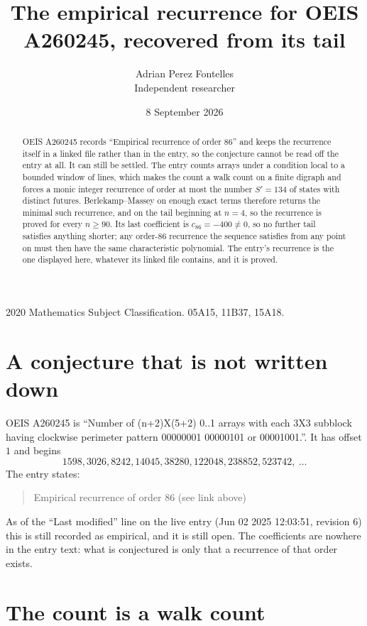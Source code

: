 \documentclass[11pt,a4paper]{article}
\title{The empirical recurrence for OEIS A260245, recovered from its tail}
\author{Adrian Perez Fontelles\\ \small Independent researcher}
\date{8 September 2026}
\theoremstyle{plain}
\theoremstyle{definition}
\begin{document}
\maketitle

\begin{abstract}
OEIS A260245 records ``Empirical recurrence of order $86$'' and keeps the recurrence itself in
a linked file rather than in the entry, so the conjecture cannot be read off the entry at all.
It can still be settled. The entry counts arrays under a condition local to a bounded window of
lines, which makes the count a walk count on a finite digraph and forces a monic integer
recurrence of order at most the number $S'=134$ of states with distinct futures. Berlekamp--Massey on
enough exact terms therefore returns the minimal such recurrence, and on the tail beginning at $n=4$, so the recurrence is proved for every $n\ge90$.
Its last coefficient is $c_{86}=-400\neq0$, so no further tail satisfies anything
shorter; any order-$86$ recurrence the sequence satisfies from any point on must then have
the same characteristic polynomial. The entry's recurrence is the one displayed here, whatever
its linked file contains, and it is proved.
\end{abstract}

\noindent\small 2020 Mathematics Subject Classification. 05A15, 11B37, 15A18.\normalsize

\section{A conjecture that is not written down}

OEIS A260245 is ``Number of (n+2)X(5+2) 0..1 arrays with each 3X3 subblock having clockwise perimeter pattern 00000001 00000101 or 00001001.''. It has offset $1$ and begins
\[
1598, 3026, 8242, 14045, 38280, 122048, 238852, 523742,\ \dots
\]
The entry states:
\begin{quote}
Empirical recurrence of order 86 (see link above)
\end{quote}
As of the ``Last modified'' line on the live entry (Jun 02 2025 12:03:51, revision 6)
this is still recorded as empirical, and it is still open. The coefficients are nowhere in the
entry text: what is conjectured is only that a recurrence of that order exists.

\section{The count is a walk count}
\end{document}
